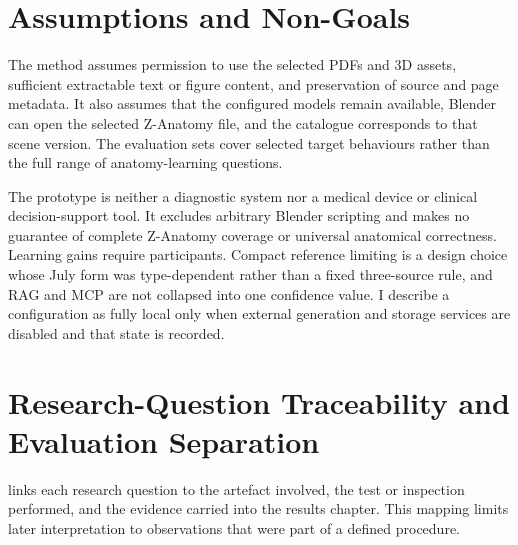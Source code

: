 \section{Assumptions and Non-Goals}
\label{sec:assumptions-nongoals}

The method assumes permission to use the selected PDFs and 3D assets, sufficient extractable text or figure content, and preservation of source and page metadata. It also assumes that the configured models remain available, Blender can open the selected Z-Anatomy file, and the catalogue corresponds to that scene version. The evaluation sets cover selected target behaviours rather than the full range of anatomy-learning questions.

The prototype is neither a diagnostic system nor a medical device or clinical decision-support tool. It excludes arbitrary Blender scripting and makes no guarantee of complete Z-Anatomy coverage or universal anatomical correctness. Learning gains require participants. Compact reference limiting is a design choice whose July form was type-dependent rather than a fixed three-source rule, and RAG and MCP are not collapsed into one confidence value. I describe a configuration as fully local only when external generation and storage services are disabled and that state is recorded.

\section{Research-Question Traceability and Evaluation Separation}
\label{sec:rq-traceability}

 links each research question to the artefact involved, the test or inspection performed, and the evidence carried into the results chapter. This mapping limits later interpretation to observations that were part of a defined procedure.

